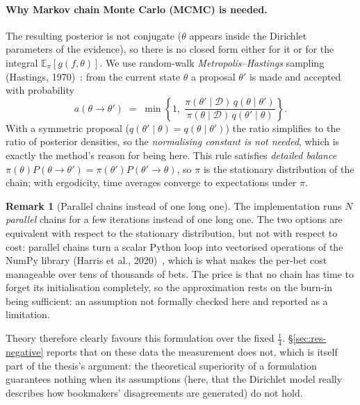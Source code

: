 \documentclass[12pt,a4paper,oneside]{report}
\renewcommand{\_}{\oldunderscore\allowbreak}
\theoremstyle{definition}
\theoremstyle{plain}
\theoremstyle{definition}   %
\newtheorem{remark}[theorem]{Remark}
\begin{document}
\paragraph{Why Markov chain Monte Carlo (MCMC) is needed.} The resulting posterior is not conjugate ($\theta$ appears
inside the Dirichlet parameters of the evidence), so there is no closed form either for it or
for the integral $\mathbb{E}_{\pi}[g(f,\theta)]$. We use random-walk
\emph{Metropolis--Hastings} sampling (Hastings, 1970)~\cite{hastings1970}: from the current state $\theta$ a proposal $\theta'$ is
made and accepted with probability \[ a(\theta\to\theta') \;=\; \min\!\left\{1,\;
\frac{\pi(\theta'\mid\mathcal{D})\,q(\theta\mid\theta')}{\pi(\theta\mid\mathcal{D})\,q(\theta'\mid\theta)}\right\}.
\] With a symmetric proposal ($q(\theta'\mid\theta)=q(\theta\mid\theta')$) the ratio simplifies
to the ratio of posterior densities, so the \emph{normalising constant is not needed}, which is
exactly the method's reason for being here. This rule satisfies \emph{detailed balance}
$\pi(\theta)P(\theta\to\theta') = \pi(\theta')P(\theta'\to\theta)$, so $\pi$ is the stationary
distribution of the chain; with ergodicity, time averages converge to expectations under $\pi$.

\begin{remark}[Parallel chains instead of one long one]
The implementation runs $N$ \emph{parallel} chains for a few iterations instead of one long one.
The two options are equivalent with respect to the stationary distribution, but not with respect
to cost: parallel chains turn a scalar Python loop into vectorised operations of the NumPy library
(Harris et al., 2020)~\cite{harris2020}, which is
what makes the per-bet cost manageable over tens of thousands of bets. The price is that no chain
has time to forget its initialisation completely, so the approximation rests on the burn-in being
sufficient: an assumption not formally checked here and reported as a limitation.
\end{remark}

Theory therefore clearly favours this formulation over the fixed $\tfrac14$.
\S\ref{sec:res-negative} reports that on these data the measurement does not, which is itself
part of the thesis's argument: the theoretical superiority of a formulation guarantees nothing
when its assumptions (here, that the Dirichlet model really describes how bookmakers'
disagreements are generated) do not hold.

\end{document}
